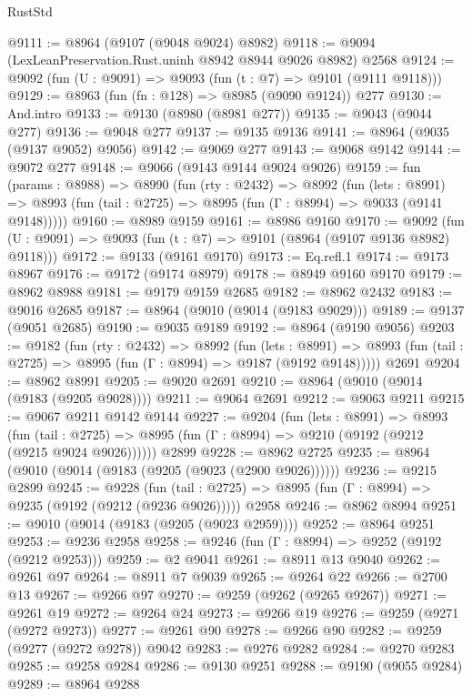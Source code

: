 \begin{lexlean}{RustStd}
\begin{coremodule}
@9111 := @8964 (@9107 (@9048 @9024) @8982)
@9118 := @9094 (LexLeanPreservation.Rust.uninh @8942 @8944 @9026 @8982) @2568
@9124 := @9092 (fun (U : @9091) => @9093 (fun (t : @7) => @9101 (@9111 @9118)))
@9129 := @8963 (fun (fn : @128) => @8985 (@9090 @9124)) @277
@9130 := And.intro
@9133 := @9130 (@8980 (@8981 @277))
@9135 := @9043 (@9044 @277)
@9136 := @9048 @277
@9137 := @9135 @9136
@9141 := @8964 (@9035 (@9137 @9052) @9056)
@9142 := @9069 @277
@9143 := @9068 @9142
@9144 := @9072 @277
@9148 := @9066 (@9143 @9144 @9024 @9026)
@9159 := fun (params : @8988) =>
  @8990
    (fun (rty : @2432) =>
    @8992
      (fun (lets : @8991) =>
      @8993 (fun (tail : @2725) => @8995 (fun (Γ : @8994) => @9033 (@9141 @9148)))))
@9160 := @8989 @9159
@9161 := @8986 @9160
@9170 := @9092 (fun (U : @9091) => @9093 (fun (t : @7) => @9101 (@8964 (@9107 @9136 @8982) @9118)))
@9172 := @9133 (@9161 @9170)
@9173 := Eq.refl.{1}
@9174 := @9173 @8967
@9176 := @9172 (@9174 @8979)
@9178 := @8949 @9160 @9170
@9179 := @8962 @8988
@9181 := @9179 @9159 @2685
@9182 := @8962 @2432
@9183 := @9016 @2685
@9187 := @8964 (@9010 (@9014 (@9183 @9029)))
@9189 := @9137 (@9051 @2685)
@9190 := @9035 @9189
@9192 := @8964 (@9190 @9056)
@9203 := @9182
    (fun (rty : @2432) =>
    @8992
      (fun (lets : @8991) =>
      @8993 (fun (tail : @2725) => @8995 (fun (Γ : @8994) => @9187 (@9192 @9148)))))
    @2691
@9204 := @8962 @8991
@9205 := @9020 @2691
@9210 := @8964 (@9010 (@9014 (@9183 (@9205 @9028))))
@9211 := @9064 @2691
@9212 := @9063 @9211
@9215 := @9067 @9211 @9142 @9144
@9227 := @9204
    (fun (lets : @8991) =>
    @8993
      (fun (tail : @2725) => @8995 (fun (Γ : @8994) => @9210 (@9192 (@9212 (@9215 @9024 @9026))))))
    @2899
@9228 := @8962 @2725
@9235 := @8964 (@9010 (@9014 (@9183 (@9205 (@9023 (@2900 @9026))))))
@9236 := @9215 @2899
@9245 := @9228
    (fun (tail : @2725) => @8995 (fun (Γ : @8994) => @9235 (@9192 (@9212 (@9236 @9026)))))
    @2958
@9246 := @8962 @8994
@9251 := @9010 (@9014 (@9183 (@9205 (@9023 @2959))))
@9252 := @8964 @9251
@9253 := @9236 @2958
@9258 := @9246 (fun (Γ : @8994) => @9252 (@9192 (@9212 @9253)))
@9259 := @2 @9041
@9261 := @8911 @13 @9040
@9262 := @9261 @97
@9264 := @8911 @7 @9039
@9265 := @9264 @22
@9266 := @2700 @13
@9267 := @9266 @97
@9270 := @9259 (@9262 (@9265 @9267))
@9271 := @9261 @19
@9272 := @9264 @24
@9273 := @9266 @19
@9276 := @9259 (@9271 (@9272 @9273))
@9277 := @9261 @90
@9278 := @9266 @90
@9282 := @9259 (@9277 (@9272 @9278)) @9042
@9283 := @9276 @9282
@9284 := @9270 @9283
@9285 := @9258 @9284
@9286 := @9130 @9251
@9288 := @9190 (@9055 @9284)
@9289 := @8964 @9288

\end{coremodule}
\end{lexlean}
